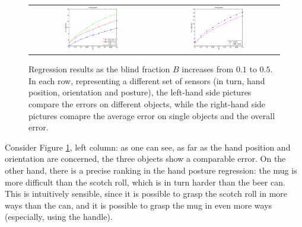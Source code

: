 \begin{figure}[htbp]
\begin{center}
\begin{tabular}{cc}
      \includegraphics[width=0.45\textwidth]{error_pst.eps} &
      \includegraphics[width=0.45\textwidth]{error_cmp_pst.eps} \\
    \end{tabular}
    \caption{Regression results as the blind fraction $B$ increases
    from $0.1$ to $0.5$. In each row, representing a different set of
    sensors (in turn, hand position, orientation and posture), the
    left-hand side pictures compare the errors on different objects,
    while the right-hand side pictures comapre the average error on
    single objects and the overall error.}
    \label{fig:err_all}
  \end{center}
\end{figure}

Consider Figure \ref{fig:err_all}, left column: as one can see, as far
as the hand position and orientation are concerned, the three objects
show a comparable error. On the other hand, there is a precise ranking
in the hand posture regression: the mug is more difficult than the
scotch roll, which is in turn harder than the beer can. This is
intuitively sensible, since it is possible to grasp the scotch roll in
more ways than the can, and it is possible to grasp the mug in even
more ways (especially, using the handle).

